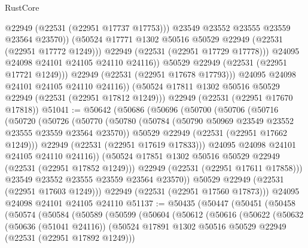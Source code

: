\begin{lexlean}{RustCore}
\begin{coremodule}
                        @22949
                        (@22531 (@22951 @17737 @17753)))
                      @23549
                      @23552
                      @23555
                      @23559
                      @23564
                      @23570))
                  (@50524 @17771 @1302 @50516 @50529 @22949 (@22531 (@22951 @17772 @1249)))
                  @22949
                  (@22531 (@22951 @17729 @17778)))
                @24095
                @24098
                @24101
                @24105
                @24110
                @24116))
            @50529
            @22949
            (@22531 (@22951 @17721 @1249)))
          @22949
          (@22531 (@22951 @17678 @17793)))
        @24095
        @24098
        @24101
        @24105
        @24110
        @24116))
    (@50524 @17811 @1302 @50516 @50529 @22949 (@22531 (@22951 @17812 @1249)))
    @22949
    (@22531 (@22951 @17670 @17818))
@51041 := @50642
    (@50686
      (@50696
        (@50700
          (@50706
            (@50716
              (@50720
                (@50726
                  (@50770
                    (@50780
                      (@50784 (@50790 @50969 @23549 @23552 @23555 @23559 @23564 @23570))
                      @50529
                      @22949
                      (@22531 (@22951 @17662 @1249)))
                    @22949
                    (@22531 (@22951 @17619 @17833)))
                  @24095
                  @24098
                  @24101
                  @24105
                  @24110
                  @24116))
              (@50524 @17851 @1302 @50516 @50529 @22949 (@22531 (@22951 @17852 @1249)))
              @22949
              (@22531 (@22951 @17611 @17858)))
            @23549
            @23552
            @23555
            @23559
            @23564
            @23570))
        @50529
        @22949
        (@22531 (@22951 @17603 @1249)))
      @22949
      (@22531 (@22951 @17560 @17873)))
    @24095
    @24098
    @24101
    @24105
    @24110
@51137 := @50435
    (@50447
      (@50451
        (@50458
          (@50574
            (@50584
              (@50589
                (@50599
                  (@50604
                    (@50612
                      (@50616
                        (@50622
                          (@50632
                            (@50636 (@51041 @24116))
                            (@50524
                              @17891
                              @1302
                              @50516
                              @50529
                              @22949
                              (@22531 (@22951 @17892 @1249)))

\end{coremodule}
\end{lexlean}
